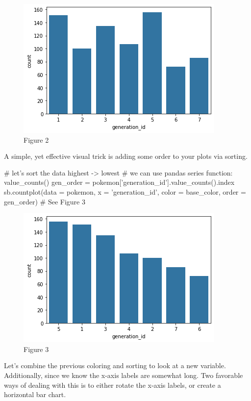 \newpage
\begin{figure}
	\includegraphics{images/figure2.png}
	\caption{Figure 2}\label{fig:figure2}
\end{figure}

A simple, yet effective visual trick is adding some order to your plots via sorting.

\begin{python}
	# let's sort the data highest -> lowest
	# we can use pandas series function: value_counts()
	gen_order = pokemon['generation_id'].value_counts().index
	sb.countplot(data = pokemon, x = 'generation_id', color = base_color, order = gen_order)
	# See Figure 3
\end{python}

\newpage
\begin{figure}
	\includegraphics{images/figure3.png}
	\caption{Figure 3}\label{fig:figure3}
\end{figure}

Let's combine the previous coloring and sorting to look at a new variable. Additionally, since we know the x-axis labels are somewhat long. Two favorable ways of dealing with this is to either rotate the x-axis labels, or create a horizontal bar chart.

